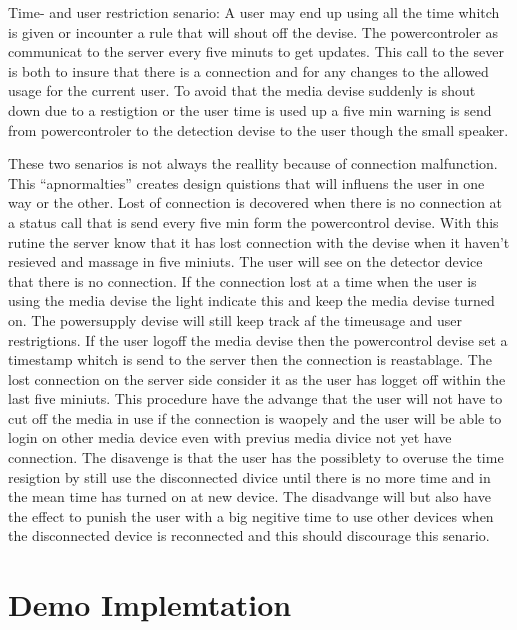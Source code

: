 Time- and user restriction senario:
A user may end up using all the time whitch is given or incounter a rule that will shout off the devise. The powercontroler as communicat to the server every five minuts to get updates. This call to the sever is both to insure that there is a connection and for any changes to the allowed usage for the current user. To avoid that the media devise suddenly is shout down due to a restigtion or the user time is used up a five min warning is send from powercontroler to the detection devise to the user though the small speaker. 

These two senarios is not always the reallity because of connection malfunction. 
This "`apnormalties"' creates design quistions that will influens the user in one way or the other.   
Lost of connection is decovered when there is no connection at a status call that is send every five min form the powercontrol devise. With this rutine the server know that it has lost connection with the devise when it haven't resieved and massage in five miniuts. The user will see on the detector device that there is no connection. If the connection lost at a time when the user is using the media devise the light indicate this and keep the media devise turned on. The powersupply devise will still keep track af the timeusage and user restrigtions. If the user logoff the media devise then the powercontrol devise set a timestamp whitch is send to the server then the connection is reastablage. The lost connection on the server side consider it as the user has logget off within the last five miniuts. This procedure have the advange that the user will not have to cut off the media in use if the connection is waopely and the user will be able to login on other media device even with previus media divice not yet have connection. The disavenge is that the user has the possiblety to overuse the time resigtion by still use the disconnected divice until there is no more time and in the mean time has turned on at new device. The disadvange will but also have the effect to punish the user with a big negitive time to use other devices when the disconnected device is reconnected and this should discourage this senario. 

\section{Demo Implemtation}

